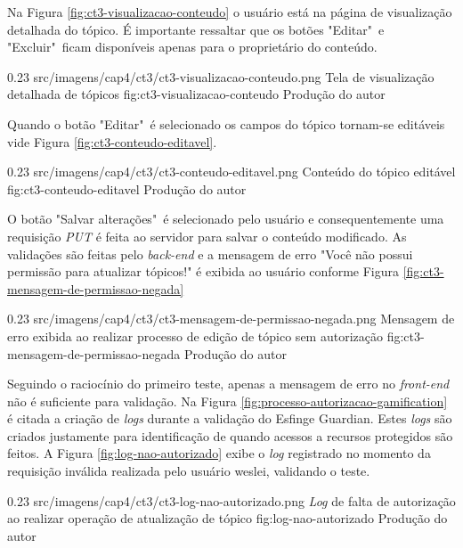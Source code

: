 \par Na Figura \ref{fig:ct3-visualizacao-conteudo} o usuário está na página de visualização detalhada do tópico. É importante ressaltar que os botões "Editar"\ e "Excluir"\ ficam disponíveis apenas para o proprietário do conteúdo. 

\begin{image}
{0.23}
{src/imagens/cap4/ct3/ct3-visualizacao-conteudo.png}
{Tela de visualização detalhada de tópicos}
{fig:ct3-visualizacao-conteudo}
{Produção do autor}
\end{image}

\par Quando o botão "Editar"\ é selecionado os campos do tópico tornam-se editáveis vide Figura \ref{fig:ct3-conteudo-editavel}.

\begin{image}
{0.23}
{src/imagens/cap4/ct3/ct3-conteudo-editavel.png}
{Conteúdo do tópico editável}
{fig:ct3-conteudo-editavel}
{Produção do autor}
\end{image}

\par O botão "Salvar alterações"\ é selecionado pelo usuário e consequentemente uma requisição \textit{PUT} é feita ao servidor para salvar o conteúdo modificado. As validações são feitas pelo \textit{back-end} e a mensagem de erro "Você não possui permissão para atualizar tópicos!" é exibida ao usuário conforme Figura \ref{fig:ct3-mensagem-de-permissao-negada}

\begin{image}
{0.23}
{src/imagens/cap4/ct3/ct3-mensagem-de-permissao-negada.png}
{Mensagem de erro exibida ao realizar processo de edição de tópico sem autorização}
{fig:ct3-mensagem-de-permissao-negada}
{Produção do autor}
\end{image}

\par Seguindo o raciocínio do primeiro teste, apenas a mensagem de erro no \textit{front-end} não é suficiente para validação. Na Figura \ref{fig:processo-autorizacao-gamification} é citada a criação de \textit{logs} durante a validação do Esfinge Guardian. Estes \textit{logs} são criados justamente para identificação de quando acessos a recursos protegidos são feitos. A Figura \ref{fig:log-nao-autorizado} exibe o \textit{log} registrado no momento da requisição inválida realizada pelo usuário weslei, validando o teste.

\begin{image}
{0.23}
{src/imagens/cap4/ct3/ct3-log-nao-autorizado.png}
{\textit{Log} de falta de autorização ao realizar operação de atualização de tópico}
{fig:log-nao-autorizado}
{Produção do autor}
\end{image}


